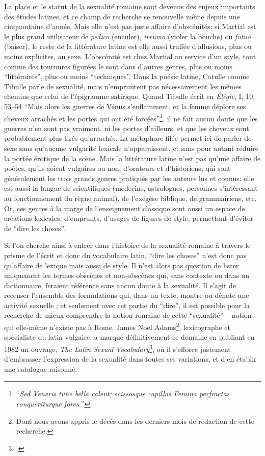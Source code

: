 La place et le statut de la sexualité romaine sont devenus des enjeux importants des études latines, et ce champ de recherche se renouvelle même depuis une cinquantaine d'année. Mais elle n'est pas juste affaire d'obscénités: si Martial est le plus grand utilisateur de \textit{pedico} (enculer), \textit{irrumo} (violer la bouche) ou \textit{futuo} (baiser), le reste de la littérature latine est elle aussi truffée d'allusions, plus ou moins explicites, au sexe. L'obscénité est chez Martial au service d'un style, tout comme des tournures figurées le sont dans d'autres genres, plus ou moins \enquote{littéraires}, plus ou moins \enquote{techniques}. Dans la poésie latine, Catulle comme Tibulle parle de sexualité, mais n'empruntent pas nécessairement les mêmes chemins que celui de l'épigramme satirique. Quand Tibulle écrit en \textit{Élégie}, I, 10, 53--54 \enquote{Mais alors les guerres de Vénus s'enflamment, et la femme déplore ses cheveux arrachés et les portes qui ont été forcées}\footnote{\enquote{\textit{Sed Veneris tune bella calent; scissosque capillos Femina perfractas conqueriturque fores.}}}, il ne fait aucun doute que les guerres n'en sont pas vraiment, ni les portes d'ailleurs, et que les cheveux sont probablement plus tirés qu'arrachés. La métaphore filée permet ici de parler de sexe sans qu'aucune vulgarité lexicale n'apparaissent, et sans pour autant réduire la portée érotique de la scène. Mais la littérature latine n'est pas qu'une affaire de poètes, qu'ils soient vulgaires ou non, d'orateurs et d'historiens, qui sont généralement les trois grands genres pratiqués par les auteurs lus et connus: elle est aussi la langue de scientifiques (médecins, astrologues, personnes s'intéressant au fonctionnement du règne animal), de l'exégèse biblique, de grammairiens, etc. Or, ces genres à la marge de l'enseignement classique sont aussi un espace de créations lexicales, d'emprunts, d'usages de figures de style, permettant d'éviter de \enquote{dire les choses}.

Si l'on cherche ainsi à entrer dans l'histoire de la sexualité romaine à travers le prisme de l'écrit et donc du vocabulaire latin, \enquote{dire les choses} n'est donc pas qu'affaire de lexique mais aussi de style. Il n'est alors pas question de lister uniquement les termes obscènes et non-obscènes qui, sans contexte ou dans un dictionnaire, feraient référence sans aucun doute à la sexualité. Il s'agit de recenser l'ensemble des formulations qui, dans un texte, montre ou dénote une activité sexuelle ; et seulement avec cet partie du \enquote{dire}, il est possible pour la recherche de mieux comprendre la notion romaine de cette \enquote{sexualité} -- notion qui elle-même n'existe pas à Rome. James Noel Adams\footnote{Dont nous avons appris le décès dans les derniers mois de rédaction de cette recherche.}, lexicographe et spécialiste du latin vulgaire, a marqué définitivement ce domaine en publiant en 1982 un ouvrage, \textit{The Latin Sexual Vocabulary}\footcite{adams}, où il s'efforce justement d'embrasser l'expression de la sexualité dans toutes ses variations, et d'en établir une catalogue raisonné.

